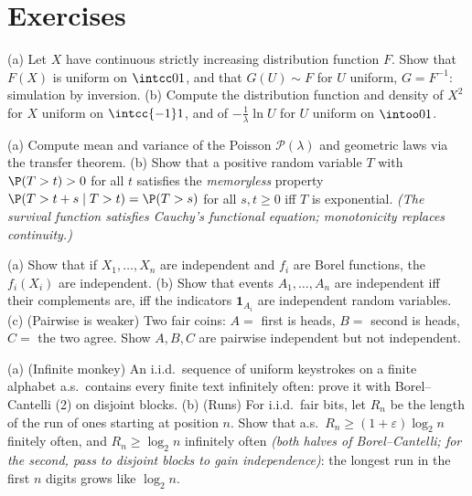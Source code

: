 \section{Exercises}

\begin{exercise}[$\star$]\label{exo:b3:probability:1}
(a) Let $X$ have continuous strictly increasing distribution
function $F$. Show that $F(X)$ is uniform on $\intcc01$, and
that $G(U) \sim F$ for $U$ uniform, $G = F^{-1}$: simulation
by inversion.
(b) Compute the distribution function and density of $X^2$
for $X$ uniform on $\intcc{-1}1$, and of $-\frac1\lambda\ln
U$ for $U$ uniform on $\intoo01$.
\end{exercise}

\begin{exercise}[$\star$]\label{exo:b3:probability:2}
(a) Compute mean and variance of the Poisson $\mathcal
P(\lambda)$ and geometric laws via the transfer theorem.
(b) Show that a positive random variable $T$ with $\P(T > t)
> 0$ for all $t$ satisfies the \emph{memoryless} property $\P(T > t + s \mid
T > t) = \P(T > s)$ for all $s, t \geq 0$ iff $T$ is
exponential. \emph{(The survival function satisfies Cauchy's
functional equation; monotonicity replaces continuity.)}
\end{exercise}

\begin{exercise}[$\star\star$]\label{exo:b3:probability:3}
(a) Show that if $X_1, \dots, X_n$ are independent and $f_i$
are Borel functions, the $f_i(X_i)$ are independent.
(b) Show that events $A_1, \dots, A_n$ are independent iff
their complements are, iff the indicators $\mathbf 1_{A_i}$
are independent random variables.
(c) (Pairwise is weaker) Two fair coins: $A = $ first is
heads, $B = $ second is heads, $C = $ the two agree. Show
$A, B, C$ are pairwise independent but not independent.
\end{exercise}

\begin{exercise}[$\star\star$]\label{exo:b3:probability:4}
(a) (Infinite monkey) An i.i.d.\ sequence of uniform
keystrokes on a finite alphabet a.s.\ contains every finite
text infinitely often: prove it with Borel--Cantelli (2) on
disjoint blocks.
(b) (Runs) For i.i.d.\ fair bits, let $R_n$ be the length of
the run of ones starting at position $n$. Show that a.s.\
$R_n \geq (1+\varepsilon)\log_2n$ finitely often, and $R_n
\geq \log_2 n$ infinitely often \emph{(both halves of
Borel--Cantelli; for the second, pass to disjoint blocks to
gain independence)}: the longest run in the first $n$ digits
grows like $\log_2n$.
\end{exercise}

